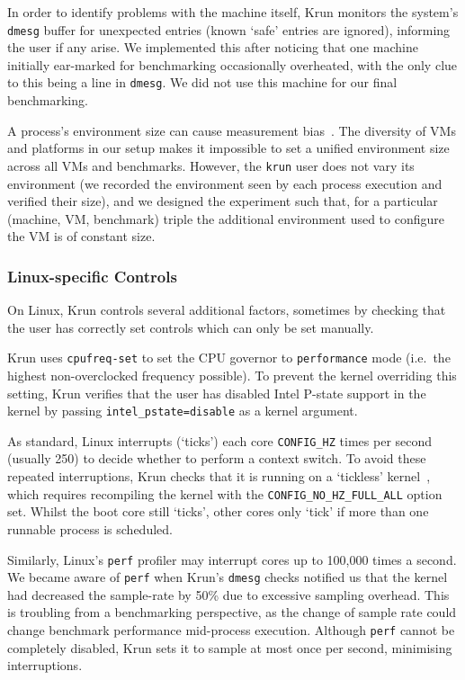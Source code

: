 \documentclass[preprint,numbers,10pt]{sigplanconf}
\newcommand{\krun}{Krun\xspace}
\begin{document}
In order to identify problems with the machine itself, \krun monitors the
system's \texttt{dmesg} buffer for unexpected entries (known `safe' entries
are ignored), informing the user if any arise. We implemented this after
noticing that one machine initially ear-marked for benchmarking occasionally
overheated, with the only clue to this being a line in \texttt{dmesg}.
We did not use this machine for our final benchmarking.

A process's environment size can cause measurement
bias~\cite{mytkowicz09surprising}. The diversity of VMs and platforms
in our setup makes it impossible to set a unified environment size across all VMs and
benchmarks. However, the \texttt{krun} user does not
vary its environment (we recorded the environment seen by each process
execution and verified their size), and we designed the experiment such that, for a particular (machine, VM,
benchmark) triple the additional environment used to configure the VM is of constant
size.


\subsubsection{Linux-specific Controls}

On Linux, \krun controls several additional factors, sometimes by checking that
the user has correctly set controls which can only be set manually.

\krun uses \texttt{cpufreq-set} to set the CPU governor to \texttt{performance} mode
(i.e.~the highest non-overclocked frequency possible).
To prevent the kernel overriding this setting, \krun verifies that the user has disabled
Intel P-state support in the kernel by passing
\texttt{intel\_pstate=disable} as a kernel argument.

As standard, Linux interrupts (`ticks') each core
\texttt{CONFIG\-\_HZ} times per second (usually 250) to
decide whether to perform a context switch. To avoid these repeated
interruptions, \krun checks that it is running on a `tickless'
kernel~\cite{tickless}, which requires recompiling the kernel with the
\texttt{CONFIG\_NO\_HZ\_FULL\_ALL} option set. Whilst the boot core still
`ticks', other cores only `tick' if more than one runnable process is scheduled.

Similarly, Linux's \texttt{perf} profiler may interrupt cores up to 100,000 times a
second. We became aware of \texttt{perf} when \krun's \texttt{dmesg} checks
notified us that the kernel had decreased the sample-rate by
50\% due to excessive sampling overhead. This is troubling
from a benchmarking perspective, as the change of sample rate could change
benchmark performance mid-process execution. Although
\texttt{perf} cannot be completely disabled, \krun sets it to sample at most
once per second, minimising interruptions.
\end{document}
